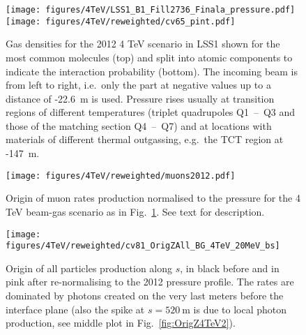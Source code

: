 \begin{figure}%
\begin{center}
  \texttt{[image: figures/4TeV/LSS1\_B1\_Fill2736\_Finala\_pressure.pdf]}
  \texttt{[image: figures/4TeV/reweighted/cv65\_pint.pdf]}
\end{center}
\vspace{-0.6cm}
 \caption{Gas densities for the 2012 4 TeV scenario in LSS1 shown for the most common molecules (top) and split into atomic components to indicate the interaction probability (bottom). The incoming beam is from left to right, i.e.~only the part at negative values up to a distance of -22.6~m is used. Pressure rises usually at transition regions of different temperatures (triplet quadrupoles Q1~--~Q3 and those of the matching section Q4~--~Q7) and at locations with materials of different thermal outgassing, e.g.~the TCT region at -147~m.
  \label{pressure2012}}
\end{figure}

\begin{figure}%
\begin{center}
  \texttt{[image: figures/4TeV/reweighted/muons2012.pdf]}
\end{center}
\vspace{-0.6cm}
 \caption{Origin of muon rates production normalised to the pressure for the 4 TeV beam-gas scenario as in Fig.~\ref{pressure2012}. See text for description.
  \label{fig:method}}
\end{figure}


\begin{figure}
\begin{center}
  \texttt{[image: figures/4TeV/reweighted/cv81\_OrigZAll\_BG\_4TeV\_20MeV\_bs]}
\end{center}
\vspace{-0.6cm}
 \caption{Origin of all particles production along $s$, in black before and in pink after re-normalising to the 2012 pressure profile. The rates are dominated by photons created on the very last meters before the interface plane (also the spike at $s=520~$m is due to local photon production, see middle plot in Fig.~\ref{fig:OrigZ4TeV2}).
  \label{fig:OrigZ4TeV}}
\end{figure}


